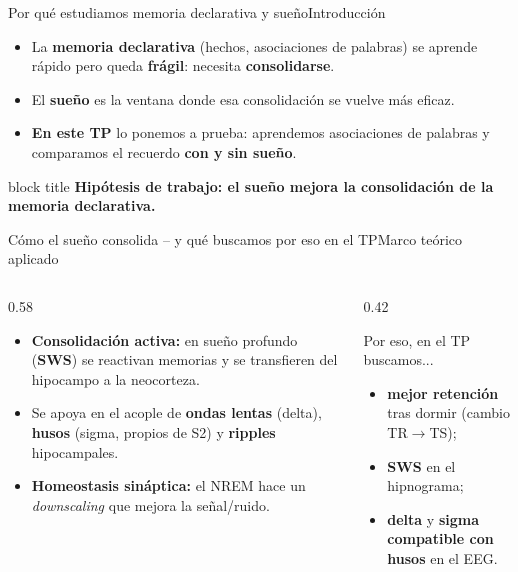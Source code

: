 \documentclass[aspectratio=169,11pt,t]{beamer}
\newcommand{\claim}[1]{%
  \begin{beamercolorbox}[wd=\textwidth,sep=7pt,rounded=true,shadow=false]{block title}%
    \centering\bfseries #1%
  \end{beamercolorbox}}
\begin{document}
\begin{frame}{Por qué estudiamos memoria declarativa y sueño}{Introducción}
  \begin{itemize}\setlength\itemsep{5pt}
    \item La \textbf{memoria declarativa} (hechos, asociaciones de palabras) se aprende rápido pero queda \textbf{frágil}: necesita \textbf{consolidarse}.
    \item El \textbf{sueño} es la ventana donde esa consolidación se vuelve más eficaz.
    \item \textbf{En este TP} lo ponemos a prueba: aprendemos asociaciones de palabras y comparamos el recuerdo \textbf{con y sin sueño}.
  \end{itemize}
  \vskip6pt
  \claim{Hipótesis de trabajo: el sueño mejora la consolidación de la memoria declarativa.}
\end{frame}

\begin{frame}{Cómo el sueño consolida -- y qué buscamos por eso en el TP}{Marco teórico aplicado}
  \begin{columns}[T,onlytextwidth]
    \begin{column}{0.58\textwidth}
      \begin{itemize}\setlength\itemsep{4pt}
        \item \textbf{Consolidación activa:} en sueño profundo (\textbf{SWS}) se reactivan memorias y se transfieren del hipocampo a la neocorteza.
        \item Se apoya en el acople de \textbf{ondas lentas} (delta), \textbf{husos} (sigma, propios de S2) y \textbf{ripples} hipocampales.
        \item \textbf{Homeostasis sináptica:} el NREM hace un \emph{downscaling} que mejora la señal/ruido.
      \end{itemize}
    \end{column}
    \begin{column}{0.42\textwidth}
      \begin{block}{Por eso, en el TP buscamos...}
        \begin{itemize}\setlength\itemsep{2pt}
          \item \textbf{mejor retención} tras dormir (cambio TR$\to$TS);
          \item \textbf{SWS} en el hipnograma;
          \item \textbf{delta} y \textbf{sigma compatible con husos} en el EEG.
        \end{itemize}
      \end{block}
    \end{column}
  \end{columns}
\end{frame}
\end{document}
